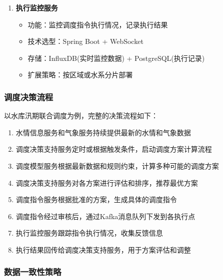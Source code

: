 \begin{enumerate}
  \begin{itemize}
  \tightlist
  \item
    功能：生成、审核和下发调度指令
  \item
    技术选型：Spring Boot + Kafka
  \item
    存储：PostgreSQL(指令记录) + Redis(临时状态)
  \item
    扩展策略：具备离线工作能力，确保在网络不稳定时仍能工作
  \end{itemize}
\item
  \textbf{执行监控服务}

  \begin{itemize}
  \tightlist
  \item
    功能：监控调度指令执行情况，记录执行结果
  \item
    技术选型：Spring Boot + WebSocket
  \item
    存储：InfluxDB(实时监控数据) + PostgreSQL(执行记录)
  \item
    扩展策略：按区域或水系分片部署
  \end{itemize}
\end{enumerate}

\subsubsection{调度决策流程}\label{ux8c03ux5ea6ux51b3ux7b56ux6d41ux7a0b}

以水库汛期联合调度为例，完整的决策流程如下：

\begin{enumerate}
\def\labelenumi{\arabic{enumi}.}
\tightlist
\item
  水情信息服务和气象服务持续提供最新的水情和气象数据
\item
  调度决策支持服务定时或根据触发条件，启动调度方案计算流程
\item
  调度模型服务根据最新数据和规则约束，计算多种可能的调度方案
\item
  调度决策支持服务对各方案进行评估和排序，推荐最优方案
\item
  调度指令服务根据批准的方案，生成具体的调度指令
\item
  调度指令经过审核后，通过Kafka消息队列下发到各执行点
\item
  执行监控服务跟踪指令执行情况，收集反馈信息
\item
  执行结果回传给调度决策支持服务，用于方案评估和调整
\end{enumerate}

\subsubsection{数据一致性策略}\label{ux6570ux636eux4e00ux81f4ux6027ux7b56ux7565}

